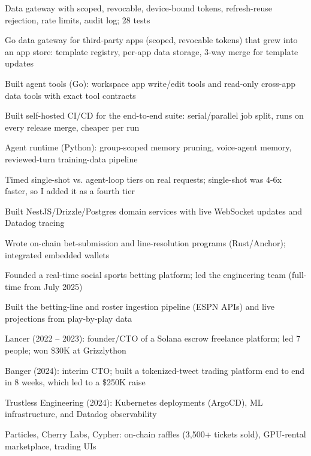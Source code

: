 \documentclass[print]{jack-resume}
\begin{document}
\begin{tightemize}
    \item Data gateway with scoped, revocable, device-bound tokens, refresh-reuse rejection, rate limits, audit log; 28 tests
    \item Go data gateway for third-party apps (scoped, revocable tokens) that grew into an app store: template registry, per-app data storage, 3-way merge for template updates
    \item Built agent tools (Go): workspace app write/edit tools and read-only cross-app data tools with exact tool contracts
    \item Built self-hosted CI/CD for the end-to-end suite: serial/parallel job split, runs on every release merge, cheaper per run
    \item Agent runtime (Python): group-scoped memory pruning, voice-agent memory, reviewed-turn training-data pipeline
    \item Timed single-shot vs. agent-loop tiers on real requests; single-shot was 4-6x faster, so I added it as a fourth tier
\end{tightemize}
\sectionsep

\begin{tightemize}
    \item Built NestJS/Drizzle/Postgres domain services with live WebSocket updates and Datadog tracing
    \item Wrote on-chain bet-submission and line-resolution programs (Rust/Anchor); integrated embedded wallets
    \item Founded a real-time social sports betting platform; led the engineering team (full-time from July 2025)
    \item Built the betting-line and roster ingestion pipeline (ESPN APIs) and live projections from play-by-play data
\end{tightemize}
\sectionsep

\begin{tightemize}
    \item Lancer (2022 – 2023): founder/CTO of a Solana escrow freelance platform; led 7 people; won \$30K at Grizzlython
    \item Banger (2024): interim CTO; built a tokenized-tweet trading platform end to end in 8 weeks, which led to a \$250K raise
    \item Trustless Engineering (2024): Kubernetes deployments (ArgoCD), ML infrastructure, and Datadog observability
    \item Particles, Cherry Labs, Cypher: on-chain raffles (3,500+ tickets sold), GPU-rental marketplace, trading UIs
\end{tightemize}
\sectionsep
\end{document}
